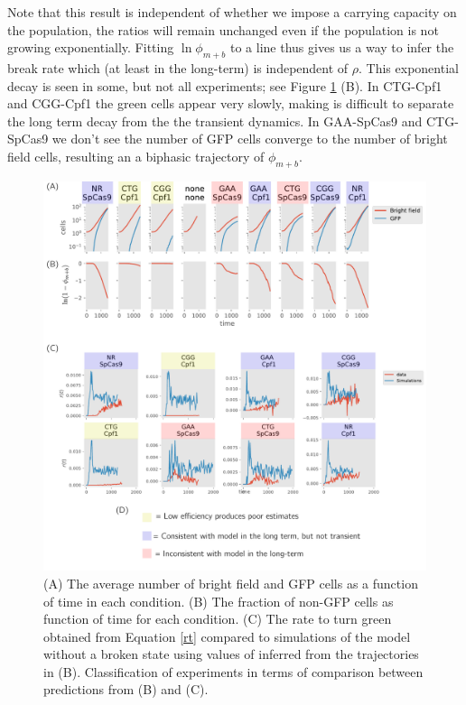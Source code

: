 \documentclass{article}
\begin{document}
Note that this result is independent of whether we impose a carrying capacity on the population, the ratios will remain unchanged even if the population is not growing exponentially. 
Fitting $\ln  \phi_{m+b}$ to a line thus gives us a way to infer the break rate which (at least in the long-term) is independent of $\rho$. 
This exponential decay is seen in some, but not all experiments; see Figure \ref{fig:1} (B). In CTG-Cpf1 and CGG-Cpf1 the green cells appear very slowly, making is difficult to separate the long term decay from the the transient dynamics. In GAA-SpCas9 and CTG-SpCas9 we don't see the number of GFP cells converge to the number of bright field cells, resulting an a biphasic trajectory of $\phi_{m+b}$. 

\begin{figure}[h!]
\centering
\includegraphics[scale=0.6]{fig1.pdf}
\caption{(A) The average number of bright field and GFP cells as a function of time in each condition.  (B) The fraction of non-GFP cells as function of time for each condition.  (C) The rate to turn green obtained from Equation \ref{rt} compared to simulations of the model without a broken state using values of inferred from the trajectories in (B). Classification of experiments in terms of comparison between predictions from (B) and (C). }\label{fig:1}
\end{figure}
\end{document}
